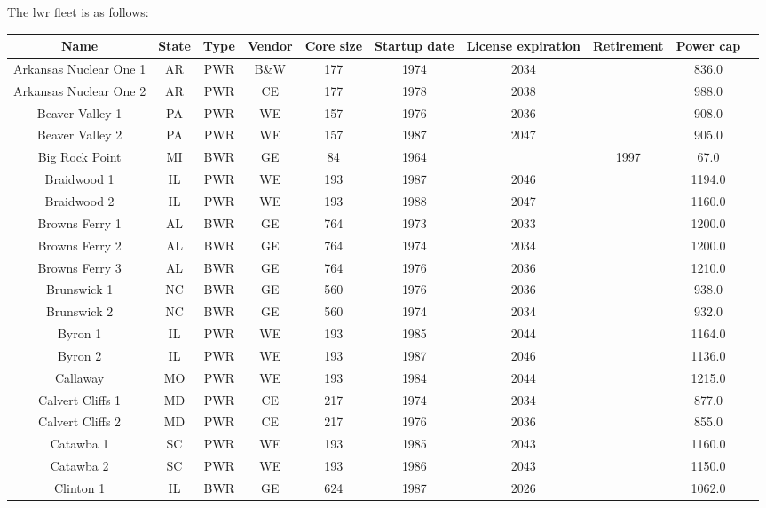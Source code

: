 The \gls{lwr} fleet is as follows:
\begin{table}[h!]
    \centering
    \begin{tabular}{c c c c c c c c c c}
    \hline
    \textbf{Name} & \textbf{State} & \textbf{Type} & \textbf{Vendor} & \textbf{Core size} & \textbf{Startup date} & \textbf{License expiration} & \textbf{Retirement} & \textbf{Power cap} \\
    \hline
    Arkansas Nuclear One 1 & AR & PWR & B\&W & 177 & 1974 & 2034 &  & 836.0 \\
    Arkansas Nuclear One 2 & AR & PWR & CE & 177 & 1978 & 2038 &  & 988.0 \\
    Beaver Valley 1 & PA & PWR & WE & 157 & 1976 & 2036 &  & 908.0 \\
    Beaver Valley 2 & PA & PWR & WE & 157 & 1987 & 2047 &  & 905.0 \\
    Big Rock Point & MI & BWR & GE & 84 & 1964 &  & 1997 & 67.0 \\
    Braidwood 1 & IL & PWR & WE & 193 & 1987 & 2046 &  & 1194.0 \\
    Braidwood 2 & IL & PWR & WE & 193 & 1988 & 2047 &  & 1160.0 \\
    Browns Ferry 1 & AL & BWR & GE & 764 & 1973 & 2033 &  & 1200.0 \\
    Browns Ferry 2 & AL & BWR & GE & 764 & 1974 & 2034 &  & 1200.0 \\
    Browns Ferry 3 & AL & BWR & GE & 764 & 1976 & 2036 &  & 1210.0 \\
    Brunswick 1 & NC & BWR & GE & 560 & 1976 & 2036 &  & 938.0 \\
    Brunswick 2 & NC & BWR & GE & 560 & 1974 & 2034 &  & 932.0 \\
    Byron 1 & IL & PWR & WE & 193 & 1985 & 2044 &  & 1164.0 \\
    Byron 2 & IL & PWR & WE & 193 & 1987 & 2046 &  & 1136.0 \\
    Callaway & MO & PWR & WE & 193 & 1984 & 2044 &  & 1215.0 \\
    Calvert Cliffs 1 & MD & PWR & CE & 217 & 1974 & 2034 &  & 877.0 \\
    Calvert Cliffs 2 & MD & PWR & CE & 217 & 1976 & 2036 &  & 855.0 \\
    Catawba 1 & SC & PWR & WE & 193 & 1985 & 2043 &  & 1160.0 \\
    Catawba 2 & SC & PWR & WE & 193 & 1986 & 2043 &  & 1150.0 \\
    Clinton 1 & IL & BWR & GE & 624 & 1987 & 2026 &  & 1062.0 \\

\end{tabular}
\end{table}

